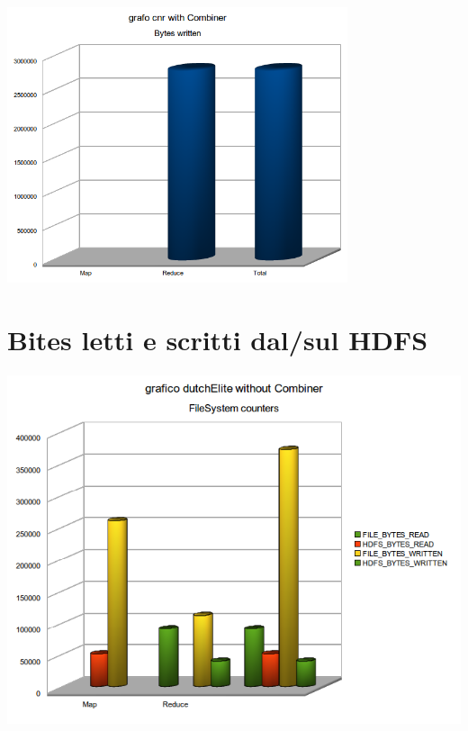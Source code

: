 \documentclass[a4paper,11pt]{report}
\begin{document}
\paragraph{}
\centerline{\includegraphics[width=100mm]{images/grafici/cnr_combBW.png}}

\section{Bites letti e scritti dal/sul HDFS}
\paragraph{}
\centerline{\includegraphics[width=150mm]{images/grafici/deFS.png}}
\end{document}
